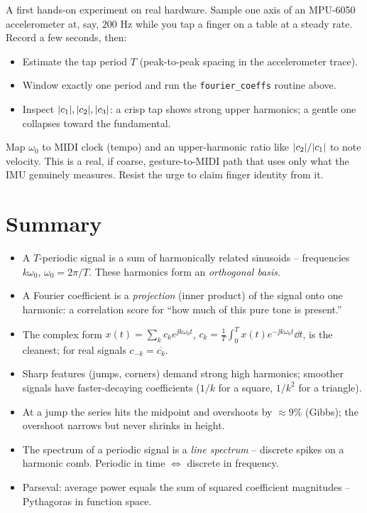 \begin{buildbox}
A first hands-on experiment on real hardware. Sample one axis of an MPU-6050 accelerometer
at, say, $200$ Hz while you tap a finger on a table at a steady rate. Record a few seconds,
then:
\begin{itemize}
\item Estimate the tap period \(T\) (peak-to-peak spacing in the accelerometer trace).
\item Window exactly one period and run the \texttt{fourier\_coeffs} routine above.
\item Inspect \(\lvert c_1\rvert, \lvert c_2\rvert, \lvert c_3\rvert\): a crisp tap shows strong upper
harmonics; a gentle one collapses toward the fundamental.
\end{itemize}
Map \(\omega_0\) to MIDI clock (tempo) and an upper-harmonic ratio like
\(\lvert c_2\rvert/\lvert c_1\rvert\) to note velocity. This is a real, if coarse, gesture-to-MIDI path
that uses only what the IMU genuinely measures. Resist the urge to claim finger identity from it.
\end{buildbox}

\section{Summary}

\begin{recoverybox}
\begin{itemize}
\item A $T$-periodic signal is a sum of harmonically related sinusoids -- frequencies
\(k\omega_0\), \(\omega_0 = 2\pi/T\). These harmonics form an \emph{orthogonal basis}.
\item A Fourier coefficient is a \emph{projection} (inner product) of the signal onto one
harmonic: a correlation score for ``how much of this pure tone is present.''
\item The complex form \(x(t)=\sum_k c_k e^{\jj k\omega_0 t}\),
\(c_k = \frac{1}{T}\int_0^T x(t) e^{-\jj k\omega_0 t}\dd t\), is the cleanest; for real signals
\(c_{-k}=\overline{c_k}\).
\item Sharp features (jumps, corners) demand strong high harmonics; smoother signals have
faster-decaying coefficients (\(1/k\) for a square, \(1/k^2\) for a triangle).
\item At a jump the series hits the midpoint and overshoots by \(\approx9\%\) (Gibbs);
the overshoot narrows but never shrinks in height.
\item The spectrum of a periodic signal is a \emph{line spectrum} -- discrete spikes on a
harmonic comb. Periodic in time \(\Leftrightarrow\) discrete in frequency.
\item Parseval: average power equals the sum of squared coefficient magnitudes -- Pythagoras
in function space.
\end{itemize}
\end{recoverybox}

